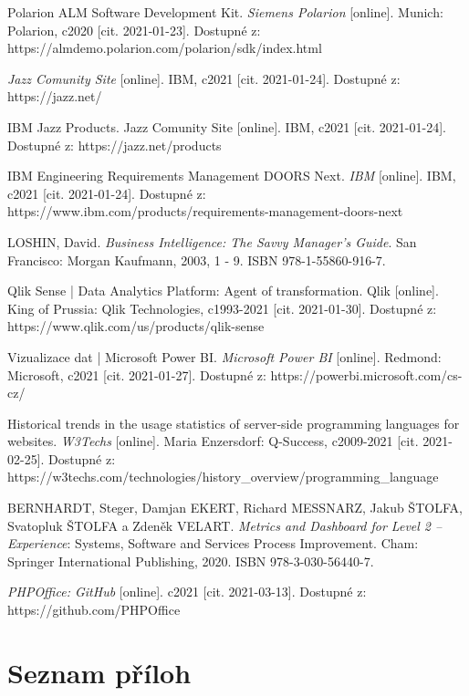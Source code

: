 \documentclass[czech,master,public,dept460,male,cpdeclaration,oneside]{diploma}
\begin{document}
\begin{thebibliography}{43}
Polarion ALM Software Development Kit. \textit{Siemens Polarion} [online]. Munich: Polarion, c2020 [cit. 2021-01-23]. Dostupné z: https://almdemo.polarion.com/polarion/sdk/index.html

\textit{Jazz Comunity Site} [online]. IBM, c2021 [cit. 2021-01-24]. Dostupné z: https://jazz.net/

IBM Jazz Products. Jazz Comunity Site [online]. IBM, c2021 [cit. 2021-01-24]. Dostupné z: https://jazz.net/products

IBM Engineering Requirements Management DOORS Next. \textit{IBM} [online]. IBM, c2021 [cit. 2021-01-24]. Dostupné z: https://www.ibm.com/products/requirements-management-doors-next

LOSHIN, David. \textit{Business Intelligence: The Savvy Manager's Guide}. San Francisco: Morgan Kaufmann, 2003, 1 - 9. ISBN 978-1-55860-916-7.

Qlik Sense | Data Analytics Platform: Agent of transformation. Qlik [online]. King of Prussia: Qlik Technologies, c1993-2021 [cit. 2021-01-30]. Dostupné z: https://www.qlik.com/us/products/qlik-sense

Vizualizace dat | Microsoft Power BI. \textit{Microsoft Power BI} [online]. Redmond: Microsoft, c2021 [cit. 2021-01-27]. Dostupné z: https://powerbi.microsoft.com/cs-cz/

Historical trends in the usage statistics of server-side programming languages for websites. \textit{W3Techs} [online]. Maria Enzersdorf: Q-Success, c2009-2021 [cit. 2021-02-25]. Dostupné z: https://w3techs.com/technologies/history\_overview/programming\_language

BERNHARDT, Steger, Damjan EKERT, Richard MESSNARZ, Jakub ŠTOLFA, Svatopluk ŠTOLFA a Zdeněk VELART. \textit{Metrics and Dashboard for Level 2 – Experience}: Systems, Software and Services Process Improvement. Cham: Springer International Publishing, 2020. ISBN 978-3-030-56440-7.

\textit{PHPOffice: GitHub} [online]. c2021 [cit. 2021-03-13]. Dostupné z: https://github.com/PHPOffice


\end{thebibliography}


\appendix
\section{Seznam příloh}
\end{document}
